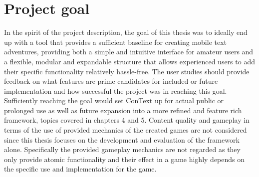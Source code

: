 \section{Project goal}
In the spirit of the project description, the goal of this thesis was to ideally end up with a tool that provides a sufficient baseline for creating mobile text adventures, providing both a simple and intuitive interface for amateur users and a flexible, modular and expandable structure that allows experienced users to add their specific functionality relatively hassle-free. 
The user studies should provide feedback on what features are prime candidates for included or future implementation and how successful the project was in reaching this goal. 
Sufficiently reaching the goal would set ConText up for actual public or prolonged use as well as future expansion into a more refined and feature rich framework, topics covered in chapters 4 and 5.
Content quality and gameplay in terms of the use of provided mechanics of the created games are not considered since this thesis focuses on the development and evaluation of the framework alone. Specifically the provided gameplay mechanics are not regarded as they only provide atomic functionality and their effect in a game highly depends on the specific use and implementation for the game. 





